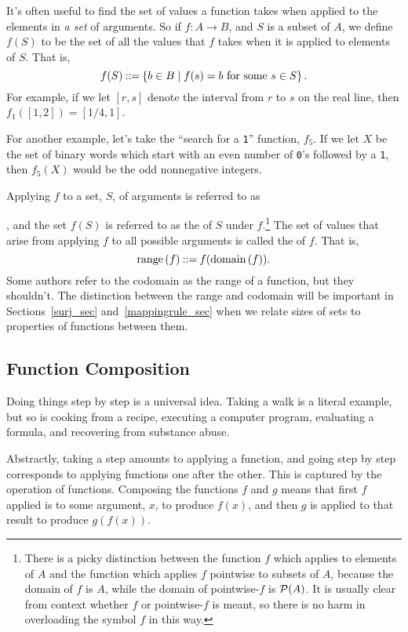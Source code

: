 It's often useful to find the set of values a function takes when applied
to the elements in \emph{a set} of arguments.  So if $f:A \to B$, and $S$
is a subset of $A$, we define $f(S)$ to be the set of all the values that
$f$ takes when it is applied to elements of $S$.  That is,
\[
f(S) \mathbin{::=} \left\{b \in B \mid f(s) = b \text{ for some } s
  \in S\right\}.
\]
For example, if we let $[r,s]$ denote the interval from $r$ to $s$ on the
real line, then $f_1([1,2]) = [1/4,1]$.

For another example, let's take the ``search for a \texttt{1}''
function, $f_5$.  If we let $X$ be the set of binary words which
start with an even number of \texttt{0}'s followed by a
\texttt{1}, then $f_5(X)$ would be the odd nonnegative integers.

Applying $f$ to a set, $S$, of arguments is referred to as
, and the
set $f(S)$ is referred to as the  of $S$ under
$f$.\footnote{There is a picky distinction between the function $f$ which
  applies to elements of $A$ and the function which applies $f$ pointwise
  to subsets of $A$, because the domain of $f$ is $A$, while the domain of
  pointwise-$f$ is $\mathcal{P}(A)$.  It is usually clear from context whether
  $f$ or pointwise-$f$ is meant, so there is no harm in overloading the
  symbol $f$ in this way.}  The set of values that arise from applying $f$
to all possible arguments is called the  of $f$.  That is,
\[
\mathop{\textup{range}}\nolimits\left(f\right) \mathbin{::=} f(\mathop{\textup{domain}}\nolimits\left(f\right)).
\]
Some authors refer to the codomain as the range of a function, but they
shouldn't.  The distinction between the range and codomain will be
important in Sections~\ref{surj_sec} and~\ref{mappingrule_sec} when we
relate sizes of sets to properties of functions between
them.

\subsection{Function Composition}\label{func_compose_subsec}

Doing things step by step is a universal idea.  Taking a walk is a literal
example, but so is cooking from a recipe, executing a computer program,
evaluating a formula, and recovering from substance abuse.

Abstractly, taking a step amounts to applying a function, and going step
by step corresponds to applying functions one after the other.  This is
captured by the operation of  functions.  Composing the
functions $f$ and $g$ means that first $f$ applied is to some argument,
$x$, to produce $f(x)$, and then $g$ is applied to that result to produce
$g(f(x))$.

